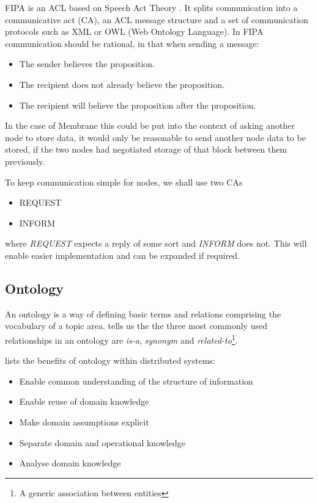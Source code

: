 \documentclass[11pt, a4paper, twocolumn, twoside]{report}
\begin{document}
FIPA is an ACL based on Speech Act Theory \citep{labrou1999agent}. It splits communication into a communicative act (CA), an ACL message structure and a set of communication protocols such as XML or OWL (Web Ontology Language). In FIPA communication should be rational, in that when sending a message:

\begin{itemize}
  \item The sender believes the proposition.
  \item The recipient does not already believe the proposition.
  \item The recipient will believe the proposition after the proposition.
\end{itemize}

In the case of Membrane this could be put into the context of asking another node to store data, it would only be reasonable to send another node data to be stored, if the two nodes had negotiated storage of that block between them previously.

To keep communication simple for nodes, we shall use two CAs

\begin{itemize}
  \item REQUEST
  \item INFORM
\end{itemize}

where \emph{REQUEST} expects a reply of some sort and \emph{INFORM} does not. This will enable easier implementation and can be expanded if required.

\subsection{Ontology} \label{sec:ontology}

An ontology is a way of defining basic terms and relations comprising the vocabulary of a topic area. \cite{sugumaran2002ontologies} tells us the the three most commonly used relationships in an ontology are \emph{is-a}, \emph{synonym} and \emph{related-to}\footnote{A generic association between entities}. 

\cite{noy2001ontology} lists the benefits of ontology within distributed systems:

\begin{itemize}
 \item Enable common understanding of the structure of information
 \item Enable reuse of domain knowledge
 \item Make domain assumptions explicit
 \item Separate domain and operational knowledge
 \item Analyse domain knowledge
\end{itemize}
\end{document}
